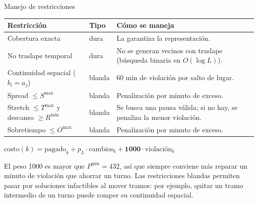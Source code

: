 \documentclass[aspectratio=169,10pt]{beamer}
\begin{document}
\begin{frame}{Manejo de restricciones}
\begin{tabular}{p{}p{}p{}}
\toprule
Restricción & Tipo & Cómo se maneja\\
\midrule
Cobertura exacta & dura & La garantiza la representación.\\
No traslape temporal & dura & No se generan vecinos con traslape (búsqueda binaria en $O(\log L)$).\\
\midrule
Continuidad espacial ($b_i=a_j$) & blanda & 60 min de violación por salto de lugar.\\
Spread $\le S^{\max}$ & blanda & Penalización por minuto de exceso.\\
Stretch $\le T^{\max}$ y descanso $\ge R^{\min}$ & blanda & Se busca una pausa válida; si no hay, se penaliza la menor violación.\\
Sobretiempo $\le O^{\max}$ & blanda & Penalización por minuto de exceso.\\
\bottomrule
\end{tabular}

\vspace{0.8em}
$\text{costo}(k)=\text{pagado}_k + p_L\cdot\text{cambios}_k + \mathbf{1000}\cdot\text{violación}_k$

\small El peso 1000 es mayor que $P^{\min}=432$, así que siempre conviene más reparar un minuto de violación que ahorrar un turno.
Las restricciones blandas permiten pasar por soluciones infactibles al mover tramos: por ejemplo, quitar un tramo intermedio de un turno puede romper su continuidad espacial.
\end{frame}
\end{document}
